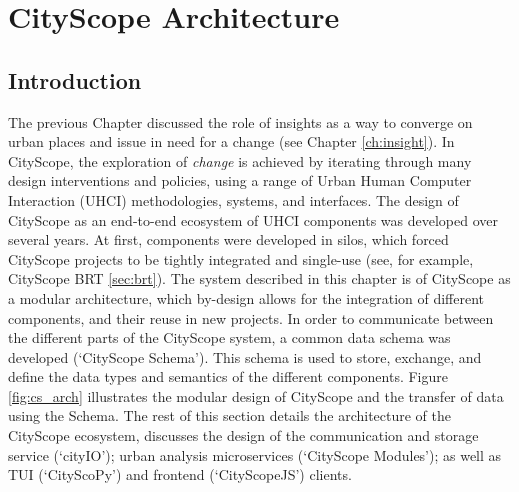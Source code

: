 \section{CityScope Architecture \label{sec:cityscope_architecture}}

 {
  \subsection{Introduction}
  {
      The previous Chapter discussed the role of insights as a way to converge on urban places and issue in need for a change (see Chapter \eqref{ch:insight}). In CityScope, the exploration of \textit{change} is achieved by iterating through many design interventions and policies, using a range of Urban Human Computer Interaction (UHCI) methodologies, systems, and interfaces. The design of CityScope as an end-to-end ecosystem of UHCI components was developed over several years. At first, components were developed in silos, which forced CityScope projects to be tightly integrated and single-use (see, for example, CityScope BRT \eqref{sec:brt}). The system described in this chapter is of CityScope as a modular architecture, which by-design allows for the integration of different components, and their reuse in new projects. In order to communicate between the different parts of the CityScope system, a common data schema was developed (`CityScope Schema'). This schema is used to store, exchange, and define the data types and semantics of the different components. Figure \eqref{fig:cs_arch} illustrates the modular design of CityScope and the transfer of data using the Schema.
      \newline
      The rest of this section details the architecture of the CityScope ecosystem, discusses the design of the communication and storage service (`cityIO'); urban analysis microservices (`CityScope Modules'); as well as TUI (`CityScoPy') and frontend (`CityScopeJS') clients.
  }


}
